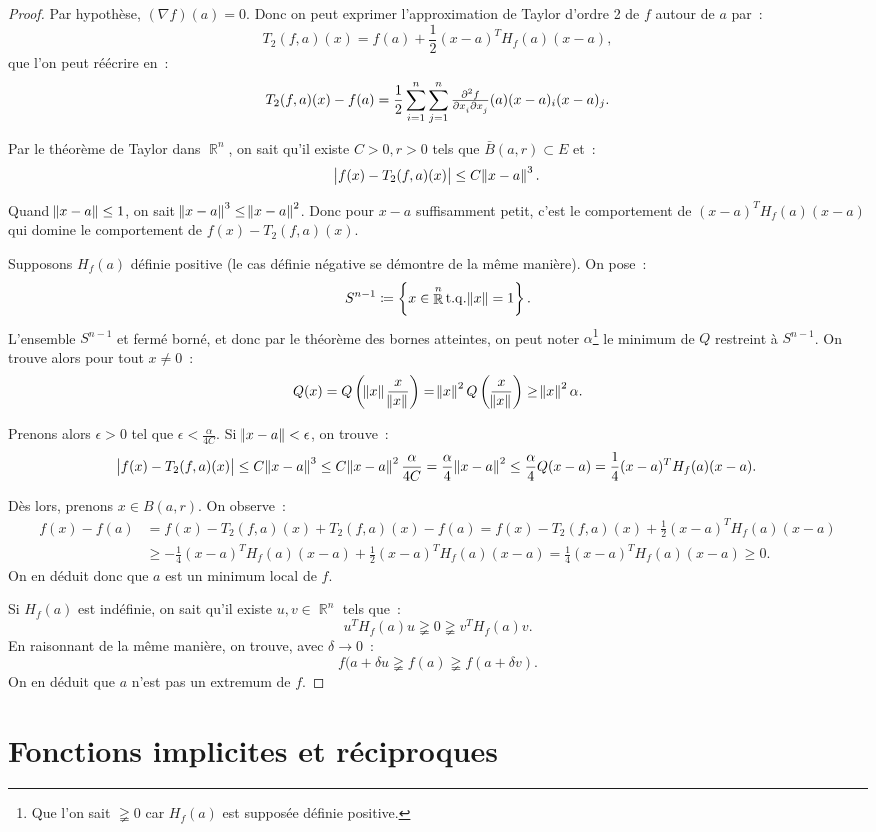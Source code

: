 \documentclass{article}
\DeclareMathOperator{\R}{\mathbb R}
\DeclareMathOperator{\tq}{ t.q. }
\theoremstyle{definition}
\theoremstyle{remark}
\begin{document}
		\begin{proof} Par hypothèse, $(\nabla f)(a) = 0$. Donc on peut exprimer l'approximation de Taylor d'ordre 2 de $f$ autour de $a$ par~:
		\[T_2(f, a)(x) = f(a) + \frac 12(x-a)^TH_f(a)(x-a),\]
		que l'on peut réécrire en~:
		\[T_2(f, a)(x) - f(a) = \frac 12\sum_{i=1}^n\sum_{j=1}^n\md f2{x_i}{}{x_j}{}(a)(x-a)_i(x-a)_j.\]

		Par le théorème de Taylor dans $\R^n$, on sait qu'il existe $C > 0, r > 0$ tels que $\bar B(a, r) \subset E$ et~:
		\[\abs {f(x)-T_2(f, a)(x)} \leq C\norm{x-a}^3.\]

		Quand $\norm {x-a} \leq 1$, on sait $\norm {x-a}^3 \leq \norm {x-a}^2$. Donc pour $x-a$ suffisamment petit, c'est le comportement de $(x-a)^TH_f(a)(x-a)$
		qui domine le comportement de $f(x)-T_2(f, a)(x)$.

		Supposons $H_f(a)$ définie positive (le cas définie négative se démontre de la même manière). On pose~:
		\[S^{n-1} \coloneqq \left\{x \in \R^n \tq \norm x = 1\right\}.\]
		L'ensemble $S^{n-1}$ et fermé borné, et donc par le théorème des bornes atteintes, on peut noter $\alpha$\footnote{Que l'on sait $\gneqq 0$ car $H_f(a)$
		est supposée définie positive.} le minimum de $Q$ restreint à $S^{n-1}$. On trouve alors pour tout $x \neq 0$~:
		\[Q(x) = Q\left(\norm x\frac x{\norm x}\right) = \norm x^2Q\left(\frac x{\norm x}\right) \geq \norm x^2\alpha.\]

		Prenons alors $\epsilon > 0$ tel que $\epsilon < \frac \alpha{4C}$. Si $\norm {x-a} < \epsilon$, on trouve~:
		\[\abs {f(x)-T_2(f, a)(x)} \leq C\norm{x-a}^3 \leq C\norm{x-a}^2\frac \alpha{4C} = \frac \alpha 4\norm{x-a}^2
		\leq \frac \alpha 4Q(x-a) = \frac 14(x-a)^TH_f(a)(x-a).\]

		Dès lors, prenons $x \in B(a, r)$. On observe~:
		\begin{align*}
			f(x)-f(a) &= f(x) - T_2(f, a)(x) + T_2(f, a)(x) - f(a) = f(x) - T_2(f, a)(x) + \frac 12(x-a)^TH_f(a)(x-a) \\
			&\geq -\frac 14(x-a)^TH_f(a)(x-a) + \frac 12(x-a)^TH_f(a)(x-a) = \frac 14(x-a)^TH_f(a)(x-a) \geq 0.
		\end{align*}
		On en déduit donc que $a$ est un minimum local de $f$.

		Si $H_f(a)$ est indéfinie, on sait qu'il existe $u, v \in \R^n$ tels que~:
		\[u^TH_f(a)u \gneqq 0 \gneqq v^TH_f(a)v.\]
		En raisonnant de la même manière, on trouve, avec $\delta \to 0$~:
		\[f(a + \delta u \gneqq f(a) \gneqq f(a + \delta v).\]
		On en déduit que $a$ n'est pas un extremum de $f$.
		\end{proof}

\newpage
\section{Fonctions implicites et réciproques}
\end{document}

